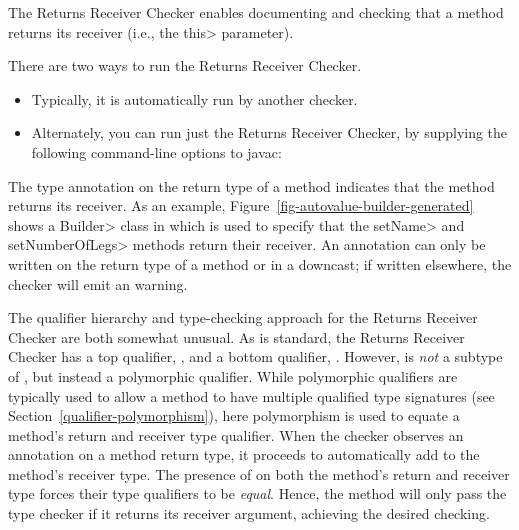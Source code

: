 \htmlhr
{}

The Returns Receiver Checker enables documenting and checking that a method
returns its receiver (i.e., the \<this> parameter).

There are two ways to run the Returns Receiver Checker.
\begin{itemize}
\item
Typically, it is automatically run by another checker.
\item
Alternately, you can run just the Returns Receiver Checker, by
supplying the following command-line options to javac:
\end{itemize}



The type annotation  on the return
type of a method indicates that the method returns its receiver. As an example,
Figure~\ref{fig-autovalue-builder-generated} shows a \<Builder> class in which
 is used to specify that the
\<setName> and \<setNumberOfLegs> methods return their receiver.  An
 annotation can only be written on
the return type of a method or in a downcast; if written elsewhere, the checker
will emit an  warning.

The qualifier hierarchy and type-checking approach for the Returns Receiver
Checker are both somewhat unusual.  As is standard, the Returns Receiver
Checker has a top qualifier,
, and a bottom qualifier,
.  However, 
is \emph{not} a subtype of ,
but instead a polymorphic qualifier.  While polymorphic qualifiers are typically
used to allow a method to have multiple qualified type signatures (see
Section~\ref{qualifier-polymorphism}), here polymorphism is used to equate a
method's return and receiver type qualifier.  When the checker observes an
 annotation on a method return type,
it proceeds to automatically add  to
the method's receiver type. The presence of
 on both the method's return and
receiver type forces their type qualifiers to be \emph{equal}.  Hence, the
method will only pass the type checker if it returns its receiver argument,
achieving the desired checking.

